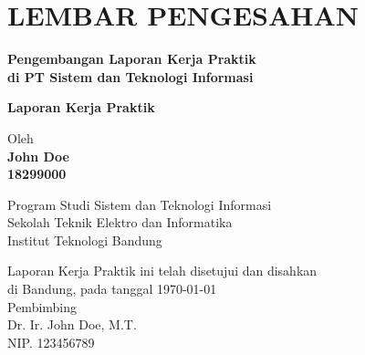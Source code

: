 \chapter*{LEMBAR PENGESAHAN}


\begin{center}
    \vspace{2cm}
  {\large\bfseries Pengembangan Laporan Kerja Praktik \\di PT Sistem dan Teknologi Informasi}\\
     \vspace{2cm}

  {\Large \textbf{Laporan Kerja Praktik}}\\


  \vspace{1.5cm}
    
    
  {\large Oleh}\\[0.3cm]
    \textbf{
    {\large John Doe}\\
    {\large 18299000}
  }\\
    
  \vspace{0.5cm}
 
  {\large Program Studi Sistem dan Teknologi Informasi}\\
  {\large Sekolah Teknik Elektro dan Informatika}\\
  {\large Institut Teknologi Bandung}\\

  \vspace{1.5cm}

  Laporan Kerja Praktik ini telah disetujui dan disahkan\\ 
  di Bandung, pada tanggal \today\\[1cm]

	Pembimbing  \\[3cm]
	Dr. Ir. John Doe, M.T.   \\[0.2cm]
	NIP. 123456789 

\end{center}

\vspace{1cm}
\noindent



